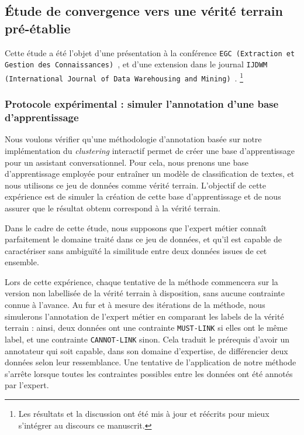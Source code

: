 	\subsection{Étude de convergence vers une vérité terrain pré-établie}
	\label{subsection:4.1.1-ETUDE-CONVERGENCE}
			
		\begin{leftBarInformation}
			Cette étude a été l'objet d'une présentation à la conférence \texttt{EGC (Extraction et Gestion des Connaissances)}~\citep{schild:conception-interactive-clustering:2021}, et d'une extension dans le journal \texttt{IJDWM (International Journal of Data Warehousing and Mining)}~\citep{schild:extension-interactive-clustering:2022}.
			\footnote{Les résultats et la discussion ont été mis à jour et réécrits pour mieux s'intégrer au discours ce manuscrit.}
		\end{leftBarInformation}

		\subsubsection{Protocole expérimental : simuler l'annotation d'une base d'apprentissage}
		
			Nous voulons vérifier qu'une méthodologie d'annotation basée sur notre implémentation du \textit{clustering} interactif permet de créer une base d'apprentissage pour un assistant conversationnel.
			Pour cela, nous prenons une base d'apprentissage employée pour entraîner un modèle de classification de textes, et nous utilisons ce jeu de données comme vérité terrain.
			L'objectif de cette expérience est de simuler la création de cette base d'apprentissage et de nous assurer que le résultat obtenu correspond à la vérité terrain.
			
			\begin{leftBarWarning}
				Dans le cadre de cette étude, nous supposons que l'expert métier connaît parfaitement le domaine traité dans ce jeu de données, et qu'il est capable de caractériser sans ambiguïté la similitude entre deux données issues de cet ensemble.
			\end{leftBarWarning}
			
			Lors de cette expérience, chaque tentative de la méthode commencera sur la version non labellisée de la vérité terrain à disposition, sans aucune contrainte connue à l'avance.
			Au fur et à mesure des itérations de la méthode, nous simulerons l'annotation de l'expert métier en comparant les labels de la vérité terrain : ainsi, deux données ont une contrainte \texttt{MUST-LINK} si elles ont le même label, et une contrainte \texttt{CANNOT-LINK} sinon. Cela traduit le prérequis d'avoir un annotateur qui soit capable, dans son domaine d'expertise,  de différencier deux données selon leur ressemblance.
			Une tentative de l'application de notre méthode s'arrête lorsque toutes les contraintes possibles entre les données ont été annotés par l'expert.

